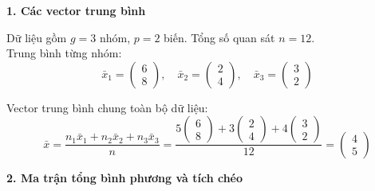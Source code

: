 \documentclass[12pt, a4paper]{article}
\begin{document}
\textbf{1. Các vector trung bình}

Dữ liệu gồm $g = 3$ nhóm, $p = 2$ biến. Tổng số quan sát $n = 12$. 
\\
Trung bình từng nhóm:
\[ \bar{x}_1 = \begin{pmatrix} 6 \\ 8 \end{pmatrix}, \quad \bar{x}_2 = \begin{pmatrix} 2 \\ 4 \end{pmatrix}, \quad \bar{x}_3 = \begin{pmatrix} 3 \\ 2 \end{pmatrix} \]

Vector trung bình chung toàn bộ dữ liệu:
\[ \bar{x} = \frac{n_1\bar{x}_1 + n_2\bar{x}_2 + n_3\bar{x}_3}{n} = \frac{5 \begin{pmatrix} 6 \\ 8 \end{pmatrix} + 3 \begin{pmatrix} 2 \\ 4 \end{pmatrix} + 4 \begin{pmatrix} 3 \\ 2 \end{pmatrix}}{12} = \begin{pmatrix} 4 \\ 5 \end{pmatrix} \]

\textbf{2. Ma trận tổng bình phương và tích chéo}
\end{document}

